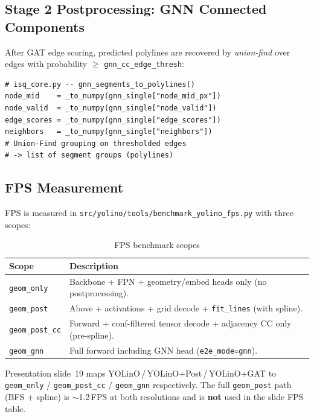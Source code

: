 \documentclass[11pt,a4paper]{article}
\begin{document}
\subsection{Stage 2 Postprocessing: GNN Connected Components}
\label{subsec:gnn_postproc}

After GAT edge scoring, predicted polylines are recovered by
\emph{union-find} over edges with probability $\geq$ \texttt{gnn\_cc\_edge\_thresh}:

\begin{lstlisting}
# isq_core.py -- gnn_segments_to_polylines()
node_mid    = _to_numpy(gnn_single["node_mid_px"])
node_valid  = _to_numpy(gnn_single["node_valid"])
edge_scores = _to_numpy(gnn_single["edge_scores"])
neighbors   = _to_numpy(gnn_single["neighbors"])
# Union-Find grouping on thresholded edges
# -> list of segment groups (polylines)
\end{lstlisting}

\subsection{FPS Measurement}
\label{subsec:fps}

FPS is measured in \texttt{src/yolino/tools/benchmark\_yolino\_fps.py}
with three scopes:

\begin{table}[H]
\centering
\caption{FPS benchmark scopes}
\begin{tabular}{lp{9cm}}
\toprule
Scope & Description \\
\midrule
\texttt{geom\_only} & Backbone + FPN + geometry/embed heads only (no postprocessing). \\
\texttt{geom\_post} & Above + activations + grid decode + \texttt{fit\_lines} (with spline). \\
\texttt{geom\_post\_cc} & Forward + conf-filtered tensor decode + adjacency CC only (pre-spline). \\
\texttt{geom\_gnn}  & Full forward including GNN head (\texttt{e2e\_mode=gnn}). \\
\bottomrule
\end{tabular}
\end{table}

\noindent
Presentation slide~19 maps YOLinO\,/\,YOLinO+Post\,/\,YOLinO+GAT to
\texttt{geom\_only} / \texttt{geom\_post\_cc} / \texttt{geom\_gnn}
respectively.
The full \texttt{geom\_post} path (BFS + spline) is $\sim$1.2\,FPS at both
resolutions and is \textbf{not} used in the slide FPS table.
\end{document}
